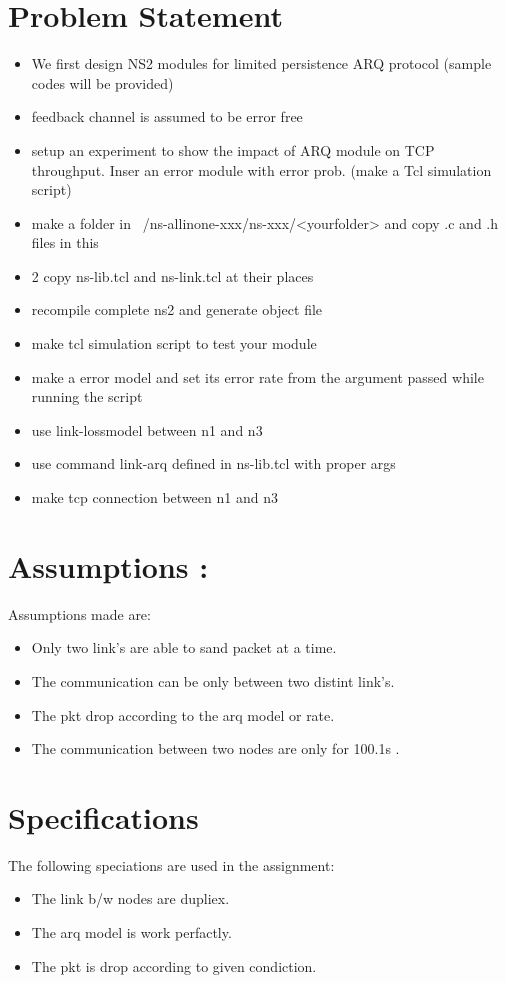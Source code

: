 \documentclass[a4paper,12pt]{article}
\begin{document}
\section{Problem Statement}
\begin{itemize}
\item  We first design NS2 modules for limited persistence ARQ protocol (sample codes will be provided)
\item feedback channel is assumed to be error free
\item setup an experiment to show the impact of ARQ module on TCP throughput. Inser an error module with error prob. (make a Tcl simulation script)
\item make a folder in ~/ns-allinone-xxx/ns-xxx/<yourfolder>  and copy .c and .h files in this
\item 2 copy ns-lib.tcl and ns-link.tcl at their places
\item recompile complete ns2 and generate object file

\item make tcl simulation script to test your module
\item  make a error model and set its error rate from the argument passed while running the script
\item  use link-lossmodel  between n1 and n3
\item  use command link-arq defined in ns-lib.tcl with proper args
\item  make tcp connection between n1 and n3
\end{itemize}
\section{Assumptions :}
Assumptions made are:
\begin{itemize}
\item Only two link's are able to sand packet at a time.
\item The communication can be only between two distint link's.
\item The pkt drop according to the arq model or rate.
\item The communication between two nodes are only for 100.1s . 
\end{itemize}

\section{Specifications}
The following speciations are used in the assignment:
\begin{itemize}
\item  The link b/w nodes are dupliex.
\item  The arq model is work perfactly.
\item  The pkt is drop according to given condiction.
\end{itemize}
\end{document}
